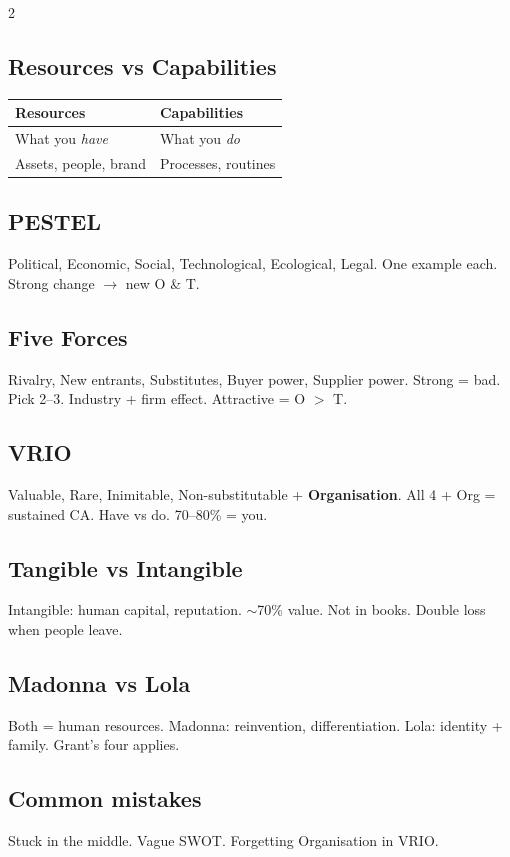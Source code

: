 \documentclass[10pt,landscape,a4paper]{article}
\begin{document}
\begin{multicols}{2}
\subsection*{\color{accent} Resources vs Capabilities}
\begin{center}
\small
\begin{tabular}{@{}ll@{}}
\toprule
\textbf{Resources} & \textbf{Capabilities} \\
\midrule
What you \textit{have} & What you \textit{do} \\
Assets, people, brand & Processes, routines \\
\bottomrule
\end{tabular}
\end{center}

\subsection*{\color{accent} PESTEL}
Political, Economic, Social, Technological, Ecological, Legal. One example each. Strong change $\to$ new O \& T.

\subsection*{\color{accent} Five Forces}
Rivalry, New entrants, Substitutes, Buyer power, Supplier power. Strong = bad. Pick 2--3. Industry + firm effect. Attractive = O $>$ T.

\subsection*{\color{accent} VRIO}
Valuable, Rare, Inimitable, Non-substitutable + \textbf{Organisation}. All 4 + Org = sustained CA. Have vs do. 70--80\% = you.

\subsection*{\color{accent} Tangible vs Intangible}
Intangible: human capital, reputation. $\sim$70\% value. Not in books. Double loss when people leave.

\subsection*{\color{accent} Madonna vs Lola}
Both = human resources. Madonna: reinvention, differentiation. Lola: identity + family. Grant's four applies.

\subsection*{\color{accent} Common mistakes}
Stuck in the middle. Vague SWOT. Forgetting Organisation in VRIO.
\end{multicols}
\end{document}
